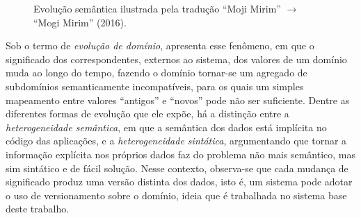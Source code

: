 \begin{figure}[htb]
  \centering
  \caption[Evolução semântica: a tradução ``Moji Mirim'' para ``Mogi Mirim''.]{%
    Evolução semântica ilustrada pela tradução ``Moji Mirim'' $\rightarrow$
    ``Mogi Mirim'' (2016).}
  \label{fig:evolucao-semantica}
\end{figure}


Sob o termo de \textit{evolução de domínio}, \citet{ventrone1991} apresenta esse fenômeno, em que o significado dos correspondentes, externos ao sistema, dos valores de um domínio muda ao longo do tempo, fazendo o domínio tornar-se um agregado de subdomínios semanticamente incompatíveis, para os quais um simples mapeamento entre valores ``antigos'' e ``novos'' pode não ser suficiente. Dentre as diferentes formas de evolução que ele expõe, há a distinção entre a \textit{heterogeneidade semântica}, em que a semântica dos dados está implícita no código das aplicações, e a \textit{heterogeneidade sintática}, argumentando que tornar a informação explícita nos próprios dados faz do problema não mais semântico, mas sim sintático e de fácil solução. Nesse contexto, observa-se que cada mudança de significado produz uma versão distinta dos dados, isto é, um sistema pode adotar o uso de versionamento sobre o domínio, ideia que é trabalhada no sistema base deste trabalho.

